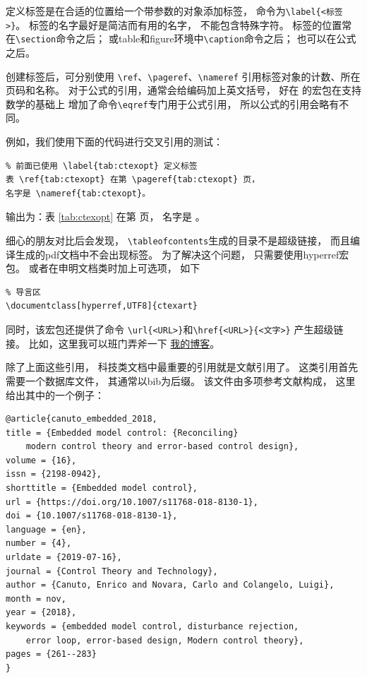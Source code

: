 \documentclass[UTF8]{ctexart}
\numberwithin{equation}{section}			%
\begin{document}
    定义标签是在合适的位置给一个带参数的对象添加标签，
    命令为\verb|\label{<标签>}|。
    标签的名字最好是简洁而有用的名字，
    不能包含特殊字符。
    标签的位置常在\verb|\section|命令之后；
    或table和figure环境中\verb|\caption|命令之后；
    也可以在公式之后。
    
    创建标签后，可分别使用
    \verb|\ref|、\verb|\pageref|、\verb|\nameref|
    引用标签对象的计数、所在页码和名称。
    对于公式的引用，通常会给编码加上英文括号，
    好在 \AmS 的宏包在支持数学的基础上
    增加了命令\verb|\eqref|专门用于公式引用，
    所以公式的引用会略有不同。
    
    例如，我们使用下面的代码进行交叉引用的测试：

\begin{lstlisting}
% 前面已使用 \label{tab:ctexopt} 定义标签
表 \ref{tab:ctexopt} 在第 \pageref{tab:ctexopt} 页，
名字是 \nameref{tab:ctexopt}。
\end{lstlisting}
    
    输出为：表 \ref{tab:ctexopt} 在第 \pageref{tab:ctexopt} 页，
    名字是 。
    
    细心的朋友对比后会发现，
    \verb|\tableofcontents|生成的目录不是超级链接，
    而且编译生成的pdf文档中不会出现标签。
    为了解决这个问题，
    只需要使用hyperref宏包。
    或者在申明文档类时加上可选项，
    如下
    
\begin{lstlisting}
% 导言区
\documentclass[hyperref,UTF8]{ctexart}
\end{lstlisting}
    
    同时，该宏包还提供了命令
    \verb|\url{<URL>}|和\verb|\href{<URL>}{<文字>}|
    产生超级链接。
    比如，这里我可以班门弄斧一下
    \href{https://ichunyu.github.io}{我的博客}。
    
    除了上面这些引用，
    科技类文档中最重要的引用就是文献引用了。
    这类引用首先需要一个数据库文件，
    其通常以bib为后缀。
    该文件由多项参考文献构成，
    这里给出其中的一个例子：
    
\begin{lstlisting}
@article{canuto_embedded_2018,
title = {Embedded model control: {Reconciling} 
    modern control theory and error-based control design},
volume = {16},
issn = {2198-0942},
shorttitle = {Embedded model control},
url = {https://doi.org/10.1007/s11768-018-8130-1},
doi = {10.1007/s11768-018-8130-1},
language = {en},
number = {4},
urldate = {2019-07-16},
journal = {Control Theory and Technology},
author = {Canuto, Enrico and Novara, Carlo and Colangelo, Luigi},
month = nov,
year = {2018},
keywords = {embedded model control, disturbance rejection,
    error loop, error-based design, Modern control theory},
pages = {261--283}
}
\end{lstlisting}
    
\end{document}

